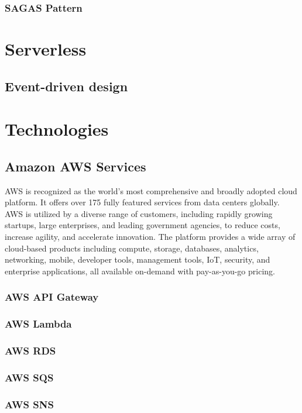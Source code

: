 \subsubsection{SAGAS Pattern}

\section{Serverless}
\subsection{Event-driven design}

\section{Technologies}
\subsection{Amazon AWS Services}
AWS is recognized as the world's most comprehensive and broadly adopted cloud platform. It offers
over 175 fully featured services from data centers globally. AWS is utilized by a diverse range of
customers, including rapidly growing startups, large enterprises, and leading government agencies,
to reduce costs, increase agility, and accelerate innovation. The platform provides a wide array of
cloud-based products including compute, storage, databases, analytics, networking, mobile, developer
tools, management tools, IoT, security, and enterprise applications, all available on-demand with
pay-as-you-go pricing.
\subsubsection{AWS API Gateway}
\subsubsection{AWS Lambda}
\subsubsection{AWS RDS}
\subsubsection{AWS SQS}
\subsubsection{AWS SNS}
